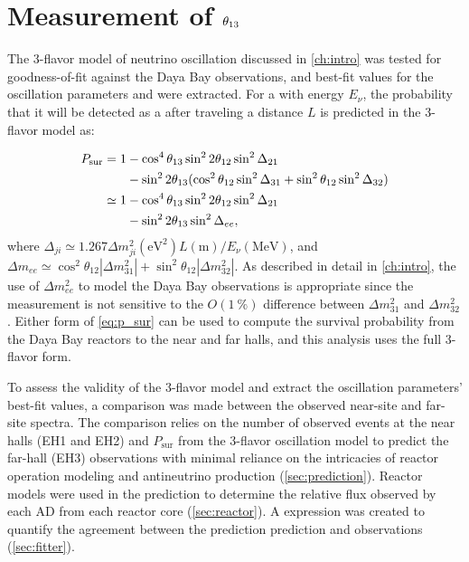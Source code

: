 \chapter{Measurement of \texorpdfstring{$\theta_{13}$}{theta13}}
\label{ch:analysis}

The 3-flavor model of neutrino oscillation discussed in \cref{ch:intro}
was tested for goodness-of-fit against the Daya Bay observations,
and best-fit values for the oscillation parameters \thetaot{} and \dmee{}
were extracted.
For a \nuebar{} with energy $E_\nu$,
the probability that it will be detected as a \nuebar{}
after traveling a distance $L$ is predicted in the 3-flavor model as:

\begin{align}\label{eq:p_sur}
    \begin{split}
        P_\text{sur} = 1 &- \cos^4\theta_{13}\sin^22\theta_{12}\sin^2\Delta_{21} \\
                         &- \sin^22\theta_{13}(\cos^2\theta_{12}\sin^2\Delta_{31}
                     + \sin^2\theta_{12}\sin^2\Delta_{32}) \\
        \simeq 1 &- \cos^4\theta_{13}\sin^22\theta_{12}\sin^2\Delta_{21} \\
                 &- \sin^22\theta_{13}\sin^2\Delta_{ee},
\end{split}
\end{align}
where
$\Delta_{ji} \simeq 1.267 \Delta m^2_{ji} (\si{\eV}^2) L(\si{\m})/E_\nu (\si{\MeV})$,
and
$\Delta m_{ee} \simeq \cos^2\theta_{12}\left|\Delta m^2_{31}\right| +
\sin^2\theta_{12}\left|\Delta m^2_{32}\right|$.
As described in detail in \cref{ch:intro},
the use of $\Delta m^2_{ee}$ to model the Daya Bay observations
is appropriate since the measurement is not sensitive
to the $O(\SI{1}{\percent})$ difference between $\Delta m^2_{31}$ and $\Delta m^2_{32}$.
Either form of \cref{eq:p_sur} can be used to compute the \nuebar{} survival probability
from the Daya Bay reactors to the near and far halls,
and this analysis uses the full 3-flavor form.

To assess the validity of the 3-flavor model and extract the oscillation parameters'
best-fit values,
a comparison was made between the observed near-site and far-site \nuebar{} spectra.
The comparison relies on the number of observed events at the near halls (EH1 and EH2)
and $P_\text{sur}$ from the 3-flavor oscillation model
to predict the far-hall (EH3) observations
with minimal reliance on the intricacies of reactor operation modeling
and antineutrino production (\cref{sec:prediction}).
Reactor models were used in the prediction
to determine the relative \nuebar{} flux
observed by each AD from each reactor core (\cref{sec:reactor}).
A \chisquare{} expression was created to quantify the agreement
between the prediction prediction and observations (\cref{sec:fitter}).

